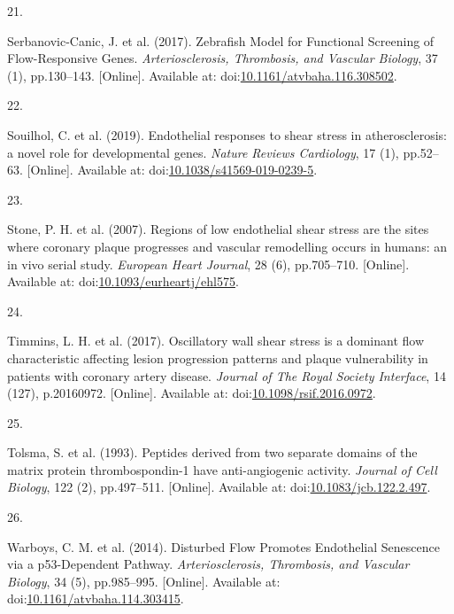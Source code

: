 \documentclass[
  11pt,
]{article}
\newlength{\cslhangindent}
\newlength{\csllabelwidth}
\newlength{\cslentryspacingunit} %
\newenvironment{CSLReferences}[2] %
 {%
  \setlength{\parindent}{0pt}
  \ifodd #1
  \let\oldpar\par
  \def\par{\hangindent=\cslhangindent\oldpar}
  \fi
  \setlength{\parskip}{#2\cslentryspacingunit}
 }%
 {}
\newcommand{\CSLLeftMargin}[1]{\parbox[t]{\csllabelwidth}{#1}}
\newcommand{\CSLRightInline}[1]{\parbox[t]{\linewidth - \csllabelwidth}{#1}\break}
\begin{document}
\begin{CSLReferences}{0}{0}
\leavevmode{}%
\CSLLeftMargin{21. }
\CSLRightInline{Serbanovic-Canic, J. {et al.} (2017). {Zebrafish Model for Functional Screening of Flow-Responsive Genes}. \emph{Arteriosclerosis, Thrombosis, and Vascular Biology}, 37 (1), pp.130--143. {[}Online{]}. Available at: doi:\href{https://doi.org/10.1161/atvbaha.116.308502}{10.1161/atvbaha.116.308502}.}

\leavevmode{}%
\CSLLeftMargin{22. }
\CSLRightInline{Souilhol, C. {et al.} (2019). {Endothelial responses to shear stress in atherosclerosis: a novel role for developmental genes}. \emph{Nature Reviews Cardiology}, 17 (1), pp.52--63. {[}Online{]}. Available at: doi:\href{https://doi.org/10.1038/s41569-019-0239-5}{10.1038/s41569-019-0239-5}.}

\leavevmode{}%
\CSLLeftMargin{23. }
\CSLRightInline{Stone, P. H. {et al.} (2007). {Regions of low endothelial shear stress are the sites where coronary plaque progresses and vascular remodelling occurs in humans: an in vivo serial study}. \emph{European Heart Journal}, 28 (6), pp.705--710. {[}Online{]}. Available at: doi:\href{https://doi.org/10.1093/eurheartj/ehl575}{10.1093/eurheartj/ehl575}.}

\leavevmode{}%
\CSLLeftMargin{24. }
\CSLRightInline{Timmins, L. H. {et al.} (2017). {Oscillatory wall shear stress is a dominant flow characteristic affecting lesion progression patterns and plaque vulnerability in patients with coronary artery disease}. \emph{Journal of The Royal Society Interface}, 14 (127), p.20160972. {[}Online{]}. Available at: doi:\href{https://doi.org/10.1098/rsif.2016.0972}{10.1098/rsif.2016.0972}.}

\leavevmode{}%
\CSLLeftMargin{25. }
\CSLRightInline{Tolsma, S. {et al.} (1993). {Peptides derived from two separate domains of the matrix protein thrombospondin-1 have anti-angiogenic activity}. \emph{Journal of Cell Biology}, 122 (2), pp.497--511. {[}Online{]}. Available at: doi:\href{https://doi.org/10.1083/jcb.122.2.497}{10.1083/jcb.122.2.497}.}

\leavevmode{}%
\CSLLeftMargin{26. }
\CSLRightInline{Warboys, C. M. {et al.} (2014). {Disturbed Flow Promotes Endothelial Senescence via a p53-Dependent Pathway}. \emph{Arteriosclerosis, Thrombosis, and Vascular Biology}, 34 (5), pp.985--995. {[}Online{]}. Available at: doi:\href{https://doi.org/10.1161/atvbaha.114.303415}{10.1161/atvbaha.114.303415}.}


\end{CSLReferences}
\end{document}
